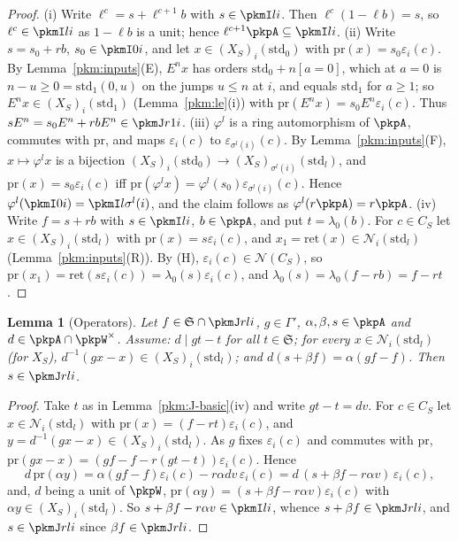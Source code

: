 \documentclass[10pt]{amsart}
\newtheorem{lemma}[theorem]{Lemma}
\theoremstyle{definition}
\theoremstyle{remark}
\begin{document}
\begin{proof}
(i) Write $\ell^c=s+\ell^{c+1}b$ with $s\in\pkmI li$. Then $\ell^c(1-\ell b)=s$, so
$\ell^c\in\pkmI li$ as $1-\ell b$ is a unit; hence $\ell^{c+1}\pkpA\subseteq\pkmI li$.
(ii) Write $s=s_0+rb$, $s_0\in\pkmI0i$, and let $x\in(X_S)_i(\mathrm{std}_0)$ with
$\mathrm{pr}(x)=s_0\varepsilon_i(c)$. By Lemma~\ref{pkm:inputs}(E), $E^nx$ has orders $\mathrm{std}_0+n[a=0]$,
which at $a=0$ is $n-u\ge0=\mathrm{std}_1(0,u)$ on the jumps $u\le n$ at $i$, and equals
$\mathrm{std}_1$ for $a\ge1$; so $E^nx\in(X_S)_i(\mathrm{std}_1)$ (Lemma~\ref{pkm:le}(i)) with
$\mathrm{pr}(E^nx)=s_0E^n\varepsilon_i(c)$. Thus $sE^n=s_0E^n+rbE^n\in\pkmJ r1i$.
(iii) $\varphi^l$ is a ring automorphism of $\pkpA$, commutes with $\mathrm{pr}$, and maps
$\varepsilon_i(c)$ to $\varepsilon_{\sigma^l(i)}(c)$. By Lemma~\ref{pkm:inputs}(F), $x\mapsto\varphi^lx$ is a
bijection $(X_S)_i(\mathrm{std}_0)\to(X_S)_{\sigma^l(i)}(\mathrm{std}_l)$, and $\mathrm{pr}(x)=
s_0\varepsilon_i(c)$ iff $\mathrm{pr}(\varphi^lx)=\varphi^l(s_0)\varepsilon_{\sigma^l(i)}(c)$. Hence
$\varphi^l(\pkmI0i)=\pkmI l{\sigma^l(i)}$, and the claim follows as $\varphi^l(r\pkpA)=r\pkpA$.
(iv) Write $f=s+rb$ with $s\in\pkmI li$, $b\in\pkpA$, and put $t=\lambda_0(b)$. For $c\in C_S$ let
$x\in(X_S)_i(\mathrm{std}_l)$ with $\mathrm{pr}(x)=s\varepsilon_i(c)$, and $x_1=\mathrm{ret}(x)\in
\mathcal N_i(\mathrm{std}_l)$ (Lemma~\ref{pkm:inputs}(R)). By (H), $\varepsilon_i(c)\in\mathcal N(C_S)$, so
$\mathrm{pr}(x_1)=\mathrm{ret}(s\varepsilon_i(c))=\lambda_0(s)\varepsilon_i(c)$, and
$\lambda_0(s)=\lambda_0(f-rb)=f-rt$.
\end{proof}

\begin{lemma}[Operators]\label{pkm:op}
Let $f\in\mathfrak S\cap\pkmJ rli$, $g\in\Gamma'$, $\alpha,\beta,s\in\pkpA$ and $d\in\pkpA\cap\pkpW^\times$.
Assume: $d\mid gt-t$ for all $t\in\mathfrak S$; for every $x\in\mathcal N_i(\mathrm{std}_l)$ (for $X_S$),
$d^{-1}(gx-x)\in(X_S)_i(\mathrm{std}_l)$; and $d(s+\beta f)=\alpha(gf-f)$. Then $s\in\pkmJ rli$.
\end{lemma}

\begin{proof}
Take $t$ as in Lemma~\ref{pkm:J-basic}(iv) and write $gt-t=dv$. For $c\in C_S$ let $x\in\mathcal
N_i(\mathrm{std}_l)$ with $\mathrm{pr}(x)=(f-rt)\varepsilon_i(c)$, and $y=d^{-1}(gx-x)\in
(X_S)_i(\mathrm{std}_l)$. As $g$ fixes $\varepsilon_i(c)$ and commutes with $\mathrm{pr}$,
$\mathrm{pr}(gx-x)=(gf-f-r(gt-t))\varepsilon_i(c)$. Hence
\[
d\,\mathrm{pr}(\alpha y)=\alpha(gf-f)\varepsilon_i(c)-r\alpha dv\,\varepsilon_i(c)=d\,(s+\beta f-r\alpha
v)\,\varepsilon_i(c),
\]
and, $d$ being a unit of $\pkpW$, $\mathrm{pr}(\alpha y)=(s+\beta f-r\alpha v)\varepsilon_i(c)$ with $\alpha
y\in(X_S)_i(\mathrm{std}_l)$. So $s+\beta f-r\alpha v\in\pkmI li$, whence $s+\beta f\in\pkmJ rli$, and
$s\in\pkmJ rli$ since $\beta f\in\pkmJ rli$.
\end{proof}
\end{document}
